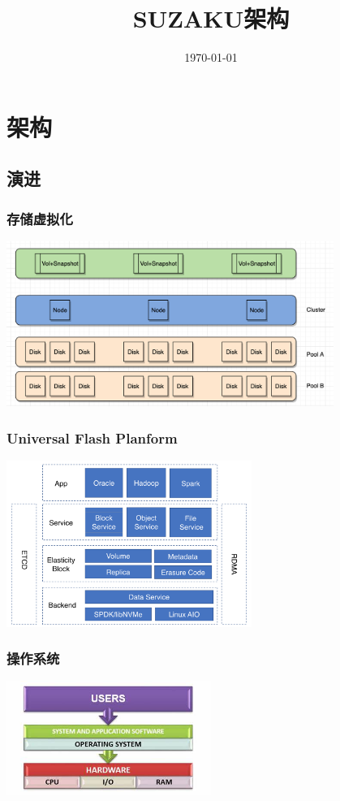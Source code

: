 \documentclass[UTF8,8pt,xcolor=dvipsnames]{beamer}
\title{SUZAKU架构}
\subtitle{}
\date{\today}
\begin{document}
\maketitle

\section{架构}

\subsection{演进}

\begin{frame}[fragile]
    \frametitle{存储虚拟化}
    \begin{center}
    \includegraphics[width=0.8\textwidth]{../imgs/cluster-virt.png}
    \end{center}
\end{frame}

\begin{frame}[fragile]
    \frametitle{Universal Flash Planform}
    \begin{center}
        \includegraphics[width=0.6\textwidth]{../imgs/universal-flash.png}
    \end{center}
\end{frame}

\begin{frame}[fragile]
    \frametitle{操作系统}
    \begin{center}
        \includegraphics[width=0.5\textwidth]{../imgs/operating-system.jpeg}
    \end{center}
\end{frame}
\end{document}

